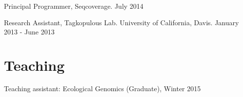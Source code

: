 \documentclass[letterpaper]{article}
\renewenvironment{itemize}{
  \begin{list}{}{
    \setlength{\leftmargin}{1.5em}
  }
}{
  \end{list}
}
\begin{document}
\begin{itemize}
\item Principal Programmer, Seqcoverage. \hfill July 2014
\item Research Assistant, Tagkopulous Lab. University of California, Davis. \hfill January 2013 - June 2013
\end{itemize}

\section*{Teaching}
\begin{itemize}
\item Teaching assistant: Ecological Genomics (Graduate), Winter 2015
\end{itemize}
\end{document}
